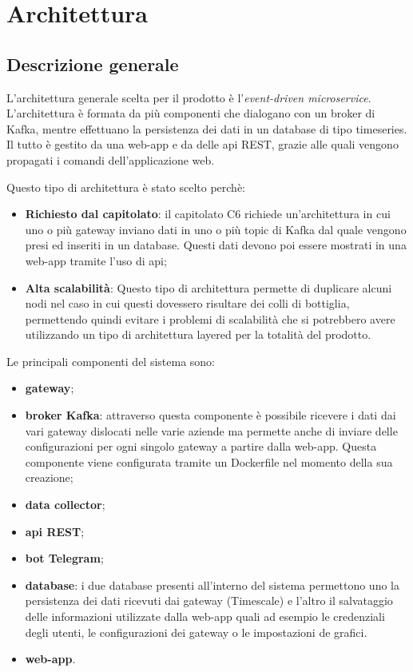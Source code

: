 \section{Architettura} 
	\subsection{Descrizione generale}
		L'architettura generale scelta per il prodotto è l'\textit{event-driven microservice}. 
		L'architettura è formata da più componenti che dialogano con un broker di Kafka, mentre effettuano la persistenza dei dati in un database di tipo timeseries. Il tutto è gestito da una web-app e da delle api REST, grazie alle quali vengono propagati i comandi dell'applicazione web.

		Questo tipo di architettura è stato scelto perchè:
		\begin{itemize}
		 	\item \textbf{Richiesto dal capitolato}: il capitolato C6 richiede un'architettura in cui uno o più gateway inviano dati in uno o più topic di Kafka dal quale vengono presi ed inseriti in un database. Questi dati devono poi essere mostrati in una web-app tramite l'uso di api;
		 	\item \textbf{Alta scalabilità}: Questo tipo di architettura permette di duplicare alcuni nodi nel caso in cui questi dovessero risultare dei colli di bottiglia, permettendo quindi evitare i problemi di scalabilità che si potrebbero avere utilizzando un tipo di architettura layered per la totalità del prodotto.
		\end{itemize}

		Le principali componenti del sistema sono:
		\begin{itemize}
		  	\item \textbf{gateway};
		  	\item \textbf{broker Kafka}: attraverso questa componente è possibile ricevere i dati dai vari gateway dislocati nelle varie aziende ma permette anche di inviare delle configurazioni per ogni singolo gateway a partire dalla web-app. Questa componente viene configurata tramite un Dockerfile nel momento della sua creazione;
		  	\item \textbf{data collector};
		  	\item \textbf{api REST};
		  	\item \textbf{bot Telegram};
		  	\item \textbf{database}: i due database presenti all'interno del sistema permettono uno la persistenza dei dati ricevuti dai gateway (Timescale) e l'altro il salvataggio delle informazioni utilizzate dalla web-app quali ad esempio le credenziali degli utenti, le configurazioni dei gateway o le impostazioni de grafici.
		  	\item \textbf{web-app}.    
		\end{itemize} 

